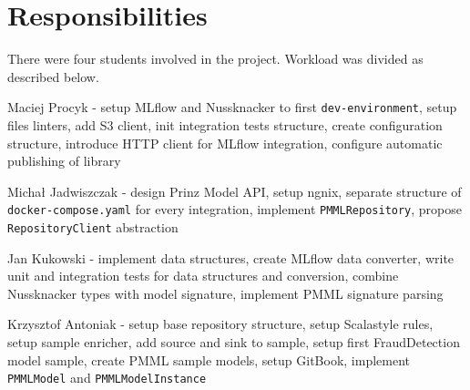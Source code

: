 \chapter{Responsibilities}
\label{chap:responsibilities}


There were four students involved in the project.
Workload was divided as described below.

Maciej Procyk - setup MLflow and Nussknacker to first \texttt{dev-environment}, setup files linters,
add S3 client, init integration tests structure, create configuration structure, introduce HTTP client for MLflow integration,
configure automatic publishing of library

Michał Jadwiszczak - design Prinz Model API, setup ngnix, separate structure of \texttt{docker-compose.yaml} for every integration,
implement \texttt{PMMLRepository}, propose \texttt{RepositoryClient} abstraction

Jan Kukowski - implement data structures, create MLflow data converter, write unit and integration tests
for data structures and conversion, combine Nussknacker types with model signature, implement PMML signature parsing

Krzysztof Antoniak - setup base repository structure, setup Scalastyle rules, setup sample enricher, add source and sink to sample,
setup first FraudDetection model sample, create PMML sample models, setup GitBook, implement \texttt{PMMLModel} and
\texttt{PMMLModelInstance}
